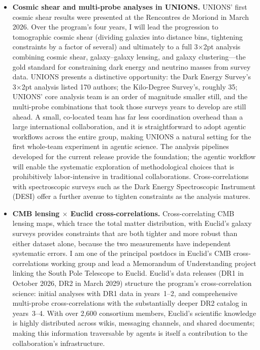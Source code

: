 \documentclass[11pt, a4paper]{article}
\begin{document}
\begin{itemize}
\item \textbf{Cosmic shear and multi-probe analyses in UNIONS.}
UNIONS' first cosmic shear results were presented at the Rencontres de Moriond in March 2026.
Over the program's four years, I will lead the progression to tomographic cosmic shear (dividing galaxies into distance bins, tightening constraints by a factor of several) and ultimately to a full 3$\times$2pt analysis combining cosmic shear, galaxy--galaxy lensing, and galaxy clustering---the gold standard for constraining dark energy and neutrino masses from survey data.
UNIONS presents a distinctive opportunity: the Dark Energy Survey's 3$\times$2pt analysis listed 170 authors; the Kilo-Degree Survey's, roughly 35; UNIONS' core analysis team is an order of magnitude smaller still, and the multi-probe combinations that took those surveys years to develop are still ahead.
A small, co-located team has far less coordination overhead than a large international collaboration, and it is straightforward to adopt agentic workflows across the entire group, making UNIONS a natural setting for the first whole-team experiment in agentic science.
The analysis pipelines developed for the current release provide the foundation; the agentic workflow will enable the systematic exploration of methodological choices that is prohibitively labor-intensive in traditional collaborations.
Cross-correlations with spectroscopic surveys such as the Dark Energy Spectroscopic Instrument (DESI) offer a further avenue to tighten constraints as the analysis matures.
\item \textbf{CMB lensing $\times$ Euclid cross-correlations.}
Cross-correlating CMB lensing maps, which trace the total matter distribution, with Euclid's galaxy surveys provides constraints that are both tighter and more robust than either dataset alone, because the two measurements have independent systematic errors.
I am one of the principal postdocs in Euclid's CMB cross-correlations working group and lead a Memorandum of Understanding project linking the South Pole Telescope to Euclid.
Euclid's data releases (DR1 in October 2026, DR2 in March 2029) structure the program's cross-correlation science: initial analyses with DR1 data in years~1--2, and comprehensive multi-probe cross-correlations with the substantially deeper DR2 catalog in years~3--4.
With over 2,600 consortium members, Euclid's scientific knowledge is highly distributed across wikis, messaging channels, and shared documents; making this information traversable by agents is itself a contribution to the collaboration's infrastructure.

\end{itemize}
\end{document}
